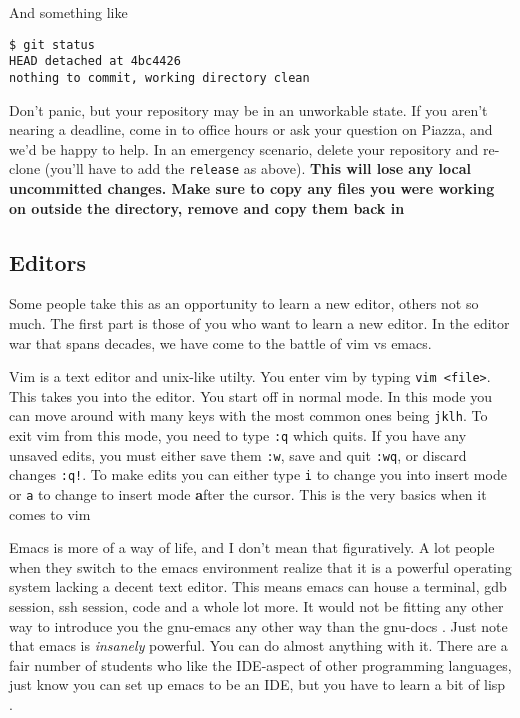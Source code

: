 And something like

\begin{lstlisting}
$ git status
HEAD detached at 4bc4426
nothing to commit, working directory clean
\end{lstlisting}

Don't panic, but your repository may be in an unworkable state. If you aren't nearing a deadline, come in to office hours or ask your question on Piazza, and we'd be happy to help. In an emergency scenario, delete your repository and re-clone (you'll have to add the \texttt{release} as above). \textbf{This will lose any local uncommitted changes. Make sure to copy any files you were working on outside the directory, remove and copy them back in}


\subsection{Editors}

Some people take this as an opportunity to learn a new editor, others not so much. The first part is those of you who want to learn a new editor. In the editor war that spans decades, we have come to the battle of vim vs emacs.

Vim is a text editor and unix-like utilty. You enter vim by typing \texttt{vim <file>}. This takes you into the editor. You start off in normal mode. In this mode you can move around with many keys with the most common ones being \texttt{jklh}. To exit vim from this mode, you need to type \texttt{:q} which quits. If you have any unsaved edits, you must either save them \texttt{:w}, save and quit \texttt{:wq}, or discard changes \texttt{:q!}. To make edits you can either type \texttt{i} to change you into insert mode or \texttt{a} to change to insert mode \textbf{a}fter the cursor. This is the very basics when it comes to vim

Emacs is more of a way of life, and I don't mean that figuratively. A lot people when they switch to the emacs environment realize that it is a powerful operating system lacking a decent text editor. This means emacs can house a terminal, gdb session, ssh session, code and a whole lot more. It would not be fitting any other way to introduce you the gnu-emacs any other way than the gnu-docs . Just note that emacs is \textit{insanely} powerful. You can do almost anything with it. There are a fair number of students who like the IDE-aspect of other programming languages, just know you can set up emacs to be an IDE, but you have to learn a bit of lisp .

